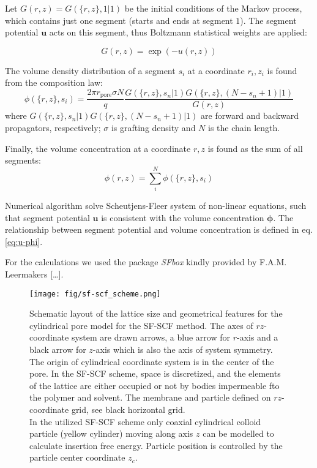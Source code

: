 \documentclass[12pt, a4paper]{article}
\begin{document}
Let $G(r, z) = G(\{r, z\}, 1|1)$ be the initial conditions of the Markov process, which contains just one segment (starts and ends at segment $1$).
The segment potential $\mathbf{u}$ acts on this segment, thus Boltzmann statistical weights are applied:

\begin{equation}
    G(r, z) = \exp(-u(r,z))
\end{equation}

The volume density distribution of a segment $s_i$ at a coordinate $r_{i}, z_{i}$ is found from the composition law:
\begin{equation}
    \phi(\{r, z\}, s_{i}) = \frac{2 \pi r_{\textrm{pore}} \sigma N}{q} \frac{G(\{r, z\}, s_n | 1) G(\{r, z\}, (N-s_n+1) | 1)}{G(r, z)}
\end{equation}
where $G(\{r, z\}, s_n | 1) G(\{r, z\}, (N-s_n+1) | 1)$ are forward and backward propagators, respectively; $\sigma$ is grafting density and $N$ is the chain length.

Finally, the volume concentration at a coordinate $r, z$ is found as the sum of all segments:
\begin{equation}
    \phi(r, z) = \sum_{i}^{N} \phi(\{r, z\}, s_{i})
\end{equation}

Numerical algorithm solve Scheutjens-Fleer system of non-linear equations, such that segment potential $\mathbf{u}$ is consistent with the volume concentration $\mathbf{\phi}$.
The relationship between segment potential and volume concentration is defined in eq. \ref{eq:u-phi}.

For the calculations we used the package \emph{SFbox} kindly provided by F.A.M. Leermakers [\dots].



\begin{figure}
        \centering
        \texttt{[image: fig/sf-scf\_scheme.png]}
        \caption{
            Schematic layout of the lattice size and geometrical features for the cylindrical pore model for the SF-SCF method.
        The axes of $rz$-coordinate system are drawn arrows, a blue arrow for $r$-axis and a black arrow for $z$-axis which is also the axis of system symmetry.
        The origin of cylindrical coordinate system is in the center of the pore.
        In the SF-SCF scheme, space is discretized, and the elements of the lattice are either occupied or not by bodies impermeable fto the polymer and solvent.
        The membrane and particle defined on $rz$-coordinate grid, see black horizontal grid.
        \\
        In the utilized SF-SCF scheme only coaxial cylindrical colloid particle (yellow cylinder) moving along axis $z$ can be modelled to calculate insertion free energy. 
        Particle position is controlled by the particle center coordinate $z_c$.
        }
    \label{fig:sf-scf_scheme}
\end{figure}
\end{document}
